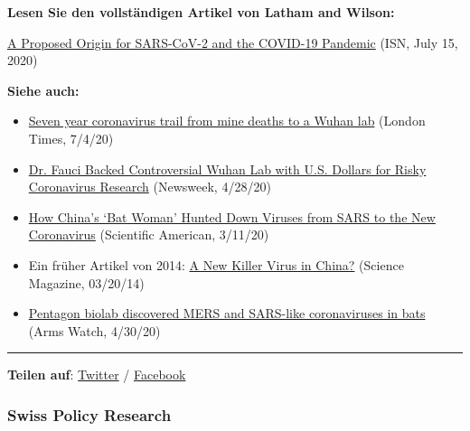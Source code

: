 \textbf{Lesen Sie den vollständigen Artikel von Latham and Wilson:}

\href{https://www.independentsciencenews.org/commentaries/a-proposed-origin-for-sars-cov-2-and-the-covid-19-pandemic/}{A
Proposed Origin for SARS-CoV-2 and the COVID-19 Pandemic} (ISN, July 15,
2020)

\textbf{Siehe auch:}

\begin{itemize}
\tightlist
\item
  \href{https://www.thetimes.co.uk/article/seven-year-covid-trail-revealed-l5vxt7jqp}{Seven
  year coronavirus trail from mine deaths to a Wuhan lab} (London Times,
  7/4/20)
\item
  \href{https://www.newsweek.com/dr-fauci-backed-controversial-wuhan-lab-millions-us-dollars-risky-coronavirus-research-1500741}{Dr.
  Fauci Backed Controversial Wuhan Lab with U.S. Dollars for Risky
  Coronavirus Research} (Newsweek, 4/28/20)
\item
  \href{https://www.scientificamerican.com/article/how-chinas-bat-woman-hunted-down-viruses-from-sars-to-the-new-coronavirus1/}{How
  China's `Bat Woman' Hunted Down Viruses from SARS to the New
  Coronavirus} (Scientific American, 3/11/20)
\item
  Ein früher Artikel von 2014:
  \href{https://www.sciencemag.org/news/2014/03/new-killer-virus-china}{A
  New Killer Virus in China?} (Science Magazine, 03/20/14)
\item
  \href{https://armswatch.com/project-g-2101-pentagon-biolab-discovered-mers-and-sars-like-coronaviruses-in-bats/}{Pentagon
  biolab discovered MERS and SARS-like coronaviruses in bats} (Arms
  Watch, 4/30/20)
\end{itemize}

\begin{center}\rule{0.5\linewidth}{\linethickness}\end{center}

\textbf{Teilen auf}:
\href{https://twitter.com/intent/tweet?url=https://swprs.org/ursprung-des-covid-19-virus-die-mojiang-minenarbeiter-hypothese/}{Twitter}
/
\href{https://www.facebook.com/share.php?u=https://swprs.org/ursprung-des-covid-19-virus-die-mojiang-minenarbeiter-hypothese/}{Facebook}

\hypertarget{swiss-policy-research}{%
\subsubsection{Swiss Policy Research}\label{swiss-policy-research}}

